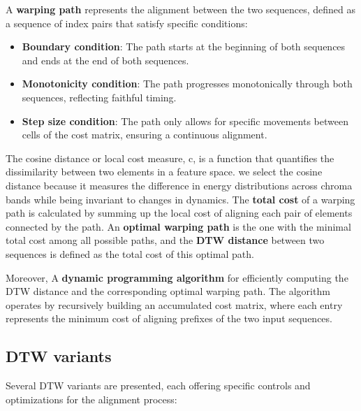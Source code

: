 \documentclass[a4paper, 9pt, twocolumn]{extarticle}
\begin{document}
A \textbf{warping path} represents the alignment between the two
sequences, defined as a sequence of index pairs that satisfy specific
conditions:

\begin{itemize}
  \item
        \textbf{Boundary condition}: The path starts at the beginning of both
        sequences and ends at the end of both sequences.
  \item
        \textbf{Monotonicity condition}: The path progresses monotonically
        through both sequences, reflecting faithful timing.
  \item
        \textbf{Step size condition}: The path only allows for specific
        movements between cells of the cost matrix, ensuring a continuous
        alignment.
\end{itemize}
The cosine distance or local cost measure, c, is a function that quantifies the dissimilarity between two elements in a feature space. we select the cosine distance because it measures the difference in energy distributions across chroma bands while being invariant to changes in dynamics.
The \textbf{total cost} of a warping path is calculated by summing up
the local cost of aligning each pair of elements connected by the path.
An \textbf{optimal warping path} is the one with the minimal total cost
among all possible paths, and the \textbf{DTW distance} between two
sequences is defined as the total cost of this optimal path.

Moreover, A \textbf{dynamic programming algorithm} for efficiently
computing the DTW distance and the corresponding optimal warping path.
The algorithm operates by recursively building an accumulated cost
matrix, where each entry represents the minimum cost of aligning
prefixes of the two input sequences.
\subsection{DTW variants}
Several DTW variants are presented, each offering specific
controls and optimizations for the alignment process:
\end{document}
